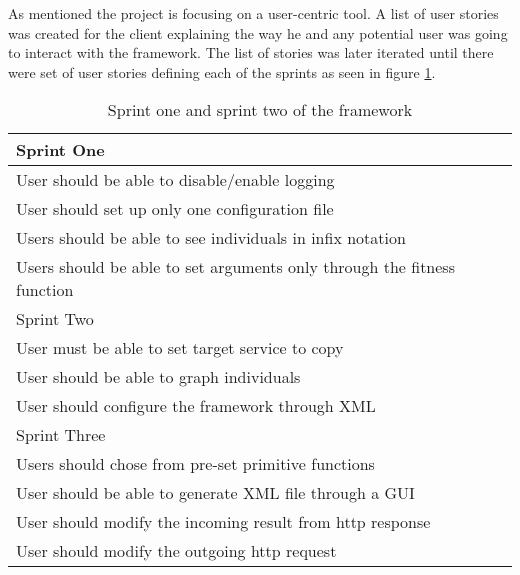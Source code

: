 As mentioned the project is focusing on a user-centric tool. A list of user stories was created for the client
explaining the way he and any potential user was going to interact with the framework. The list
of stories was later iterated until there were set of user stories defining each of the sprints
as seen in figure \ref{table:userstories}.
\begin{table}[ht] 
\caption{Sprint one and sprint two of the framework} %
\centering %
\begin{tabular}{l} %
\hline\hline %
Sprint One\\ [0.5ex] %
\hline %
User should be able to disable/enable logging\\
User should set up only one configuration file\\
Users should be able to see individuals in infix notation\\
Users should be able to set arguments only through the fitness function \\

\hline\hline 
Sprint Two\\
\hline
User must be able to set target service to copy\\
User should be able to graph individuals\\
User should configure the framework through XML\\
\hline\hline 
Sprint Three\\
\hline
Users should chose from pre-set primitive functions\\
User should be able to generate XML file through a GUI\\
User should modify the incoming result from http response\\
User should modify the outgoing http request \\
\hline\hline 
\end{tabular} 
\label{table:userstories} %
\end{table}


